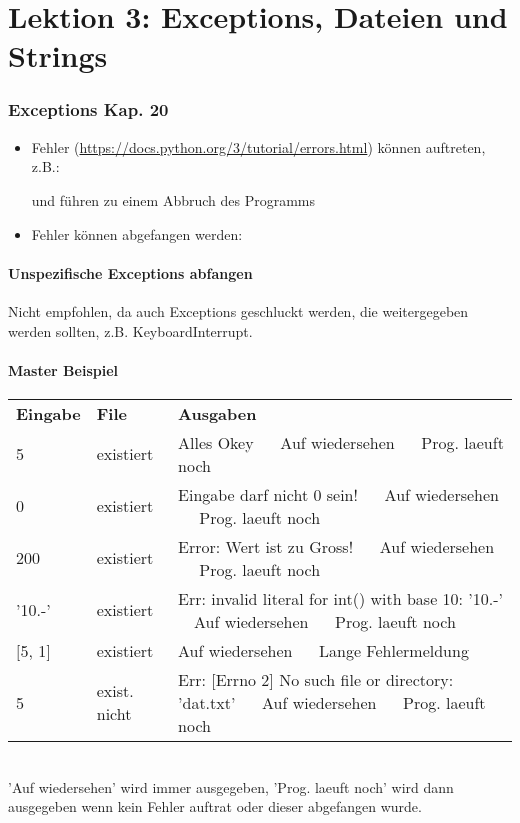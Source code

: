 \part*{Lektion 3: Exceptions, Dateien und Strings}
\section[Exceptions]{Exceptions \tiny{Kap. 20}}
\begin{itemize}
	\item Fehler (\url{https://docs.python.org/3/tutorial/errors.html}) können auftreten, z.B.:
	
	und führen zu einem Abbruch des Programms
	\item Fehler können abgefangen werden:
	
\end{itemize}

\subsection{Unspezifische Exceptions abfangen}
Nicht empfohlen, da auch Exceptions geschluckt werden, die weitergegeben werden sollten, z.B. KeyboardInterrupt.\\


\subsection{Master Beispiel}

\begin{tabular}{lll}
	\textbf{Eingabe} & \textbf{File}  & \textbf{Ausgaben}\\
	5 		& existiert & Alles Okey $ \quad $ Auf wiedersehen $ \quad $ Prog. laeuft noch\\
	0 		& existiert & Eingabe darf nicht 0 sein! $ \quad $ Auf wiedersehen $ \quad $ Prog. laeuft noch\\
	200		& existiert & Error: Wert ist zu Gross! $ \quad $ Auf wiedersehen $ \quad $ Prog. laeuft noch\\
	'10.-' 	& existiert & Err: invalid literal for int() with base 10: '10.-' $ \quad $Auf wiedersehen $ \quad $ Prog. laeuft noch\\
	$[$5, 1$]$ 	& existiert & Auf wiedersehen $ \quad $ Lange Fehlermeldung\\ 
	5		& exist. nicht & Err: [Errno 2] No such file or directory: 'dat.txt' $ \quad $ Auf wiedersehen $ \quad $ Prog. laeuft noch
\end{tabular}\\[10pt]
'Auf wiedersehen' wird immer ausgegeben, 'Prog. laeuft noch' wird dann ausgegeben wenn kein Fehler auftrat oder dieser abgefangen wurde.
%
%

